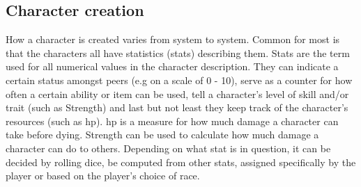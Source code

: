 \subsection{Character creation}

How a character is created varies from system to system. Common for most is that the characters all have statistics (stats) describing them.
Stats are the term used for all numerical values in the character description. They can indicate a certain status amongst peers (e.g on a scale of 0 - 10), serve as a counter for how often a certain ability or item can be used, tell a character's level of skill and/or trait (such as Strength) and last but not least they keep track of the character's resources (such as \ac{hp}).
\ac{hp} is a measure for how much damage a character can take before dying. Strength can be used to calculate how much damage a character can do to others. Depending on what stat is in question, it can be decided by rolling dice, be computed from other stats, assigned specifically by the player or based on the player's choice of race.

